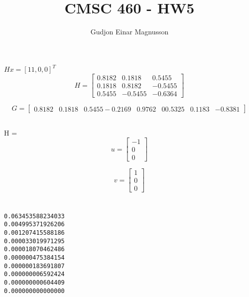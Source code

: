 \documentclass[12pt]{article}
\begin{document}
\title{CMSC 460 - HW5}
\author{Gudjon Einar Magnusson}

\maketitle

\section{}

\subsection{} %
$Hx = [11, 0, 0]^T$
\[
H =  
\begin{bmatrix}
    0.8182 & 0.1818 & 0.5455 \\
    0.1818 & 0.8182 & -0.5455 \\
    0.5455 & -0.5455 & -0.6364    
\end{bmatrix}
\]

\[
G =  
\begin{bmatrix}
    0.8182 & 0.1818 & 0.5455
   -0.2169 & 0.9762 & 0
    0.5325 & 0.1183 & -0.8381
\end{bmatrix}
\]

\subsection{} %
H =  
\[
u =  
\begin{bmatrix}
    -1 \\
    0 \\
    0
\end{bmatrix}
\]

\[
v =  
\begin{bmatrix}
    1 \\
    0 \\
    0
\end{bmatrix}
\]

\section{}

\subsection{} %

\begin{minipage}{\linewidth}
\begin{lstlisting}
0.063453588234033
0.004995371926206
0.001207415588186
0.000033019971295
0.000018070462486
0.000000475384154
0.000000183691807
0.000000006592424
0.000000000604409
0.000000000000000
\end{lstlisting}
\end{minipage}
\end{document}
